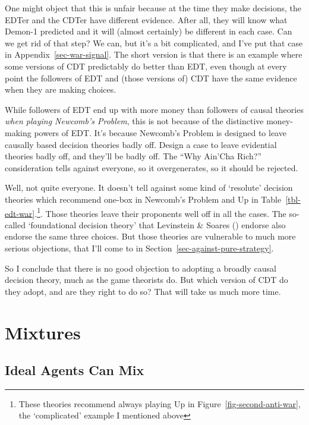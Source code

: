\documentclass[
  12pt,
  letterpaper,
  DIV=11,
  numbers=noendperiod]{scrreprt}
\begin{document}
One might object that this is unfair because at the time they make
decisions, the EDTer and the CDTer have different evidence. After all,
they will know what Demon-1 predicted and it will (almost certainly) be
different in each case. Can we get rid of that step? We can, but it's a
bit complicated, and I've put that case in
Appendix~\ref{sec-war-signal}. The short version is that there is an
example where some versions of CDT predictably do better than EDT, even
though at every point the followers of EDT and (those versions of) CDT
have the same evidence when they are making choices.

While followers of EDT end up with more money than followers of causal
theories \emph{when playing Newcomb's Problem}, this is not because of
the distinctive money-making powers of EDT. It's because Newcomb's
Problem is designed to leave causally based decision theories badly off.
Design a case to leave evidential theories badly off, and they'll be
badly off. The ``Why Ain'Cha Rich?'' consideration tells against
everyone, so it overgenerates, so it should be rejected.

Well, not quite everyone. It doesn't tell against some kind of
`resolute' decision theories which recommend one-box in Newcomb's
Problem and Up in Table~\ref{tbl-edt-war}.\footnote{These theories
  recommend always playing Up in Figure~\ref{fig-second-anti-war}, the
  `complicated' example I mentioned above}. Those theories leave their
proponents well off in all the cases. The so-called `foundational
decision theory' that Levinstein \& Soares
() endorse also endorse the
same three choices. But those theories are vulnerable to much more
serious objections, that I'll come to in
Section~\ref{sec-against-pure-strategy}.

So I conclude that there is no good objection to adopting a broadly
causal decision theory, much as the game theorists do. But which version
of CDT do they adopt, and are they right to do so? That will take us
much more time.


\chapter{Mixtures}\label{sec-mixed}

\section{Ideal Agents Can Mix}\label{ideal-agents-can-mix}
\end{document}
